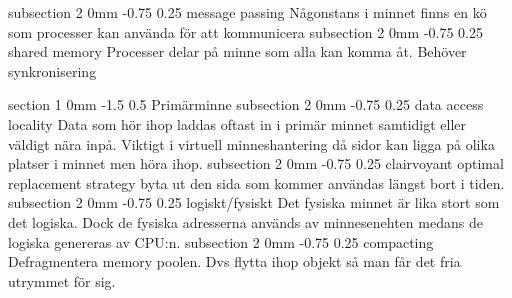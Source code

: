 \documentclass[a4paper,11pt]{article}
\makeatletter
\renewcommand{\section}{\@startsection
   {section}%
   {1}%
   {0mm}%
   {-1.5\baselineskip}%
   {0.5\baselineskip}%
   {\sffamily\bfseries\upshape\normalsize}}%
\renewcommand{\subsection}{\@startsection
   {subsection}%
   {2}%
   {0mm}%
   {-0.75\baselineskip}%
   {0.25\baselineskip}%
   {\rmfamily\normalfont\slshape\normalsize}}%
\makeatother
\begin{document}
\subsection{message passing}
Någonstans i minnet finns en kö som processer kan använda för att kommunicera
\subsection{shared memory}
Processer delar på minne som alla kan komma åt. Behöver synkronisering


\section{Primärminne}
\subsection{data access locality}
Data som hör ihop laddas oftast in i primär minnet samtidigt eller väldigt nära inpå. Viktigt i virtuell minneshantering då sidor kan ligga på olika platser i minnet men höra ihop.
\subsection{clairvoyant optimal replacement strategy}
byta ut den sida som kommer användas längst bort i tiden.
\subsection{logiskt/fysiskt}
Det fysiska minnet är lika stort som det logiska. Dock de fysiska adresserna används av minnesenehten medans de logiska genereras av CPU:n.
\subsection{compacting}
Defragmentera memory poolen. Dvs flytta ihop objekt så man får det fria utrymmet för sig.
\end{document}
